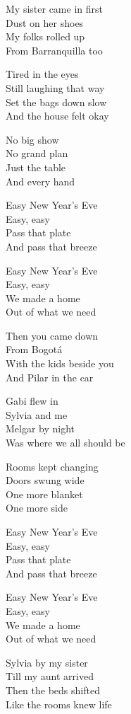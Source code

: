 \begin{lyrics}
My sister came in first\\
Dust on her shoes\\
My folks rolled up\\
From Barranquilla too

Tired in the eyes\\
Still laughing that way\\
Set the bags down slow\\
And the house felt okay

No big show\\
No grand plan\\
Just the table\\
And every hand

Easy New Year's Eve\\
Easy, easy\\
Pass that plate\\
And pass that breeze

Easy New Year's Eve\\
Easy, easy\\
We made a home\\
Out of what we need

Then you came down\\
From Bogotá\\
With the kids beside you\\
And Pilar in the car

Gabi flew in\\
Sylvia and me\\
Melgar by night\\
Was where we all should be

Rooms kept changing\\
Doors swung wide\\
One more blanket\\
One more side

Easy New Year's Eve\\
Easy, easy\\
Pass that plate\\
And pass that breeze

Easy New Year's Eve\\
Easy, easy\\
We made a home\\
Out of what we need

Sylvia by my sister\\
Till my aunt arrived\\
Then the beds shifted\\
Like the rooms knew life


\end{lyrics}
